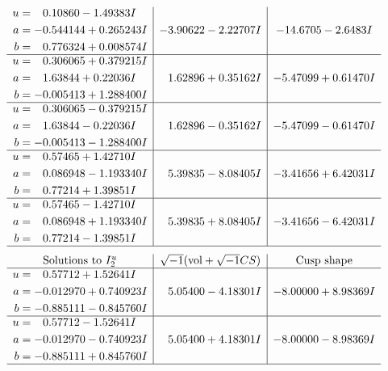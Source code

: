 \documentclass[1p]{elsarticle_modified}
\theoremstyle{definition}
\newcommand{\I}{\sqrt{-1}}
\begin{document}
$$\begin{array}{c|c|c}
\begin{aligned}
u &= \phantom{-}0.10860 - 1.49383 I \\
a &= -0.544144 + 0.265243 I \\
b &= \phantom{-}0.776324 + 0.008574 I\end{aligned}
 & -3.90622 - 2.22707 I & -14.6705 - 2.6483 I \\ \hline\begin{aligned}
u &= \phantom{-}0.306065 + 0.379215 I \\
a &= \phantom{-}1.63844 + 0.22036 I \\
b &= -0.005413 + 1.288400 I\end{aligned}
 & \phantom{-}1.62896 + 0.35162 I & -5.47099 + 0.61470 I \\ \hline\begin{aligned}
u &= \phantom{-}0.306065 - 0.379215 I \\
a &= \phantom{-}1.63844 - 0.22036 I \\
b &= -0.005413 - 1.288400 I\end{aligned}
 & \phantom{-}1.62896 - 0.35162 I & -5.47099 - 0.61470 I \\ \hline\begin{aligned}
u &= \phantom{-}0.57465 + 1.42710 I \\
a &= \phantom{-}0.086948 - 1.193340 I \\
b &= \phantom{-}0.77214 + 1.39851 I\end{aligned}
 & \phantom{-}5.39835 - 8.08405 I & -3.41656 + 6.42031 I \\ \hline\begin{aligned}
u &= \phantom{-}0.57465 - 1.42710 I \\
a &= \phantom{-}0.086948 + 1.193340 I \\
b &= \phantom{-}0.77214 - 1.39851 I\end{aligned}
 & \phantom{-}5.39835 + 8.08405 I & -3.41656 - 6.42031 I\\
 \hline 
 \end{array}$$\newpage$$\begin{array}{c|c|c}  
\text{Solutions to }I^u_{2}& \I (\text{vol} + \sqrt{-1}CS) & \text{Cusp shape}\\
 \hline 
\begin{aligned}
u &= \phantom{-}0.57712 + 1.52641 I \\
a &= -0.012970 + 0.740923 I \\
b &= -0.885111 - 0.845760 I\end{aligned}
 & \phantom{-}5.05400 - 4.18301 I & -8.00000 + 8.98369 I \\ \hline\begin{aligned}
u &= \phantom{-}0.57712 - 1.52641 I \\
a &= -0.012970 - 0.740923 I \\
b &= -0.885111 + 0.845760 I\end{aligned}
 & \phantom{-}5.05400 + 4.18301 I & -8.00000 - 8.98369 I\\
 \hline 
 \end{array}$$\newpage\newpage\renewcommand{\arraystretch}{1}
\end{document}
